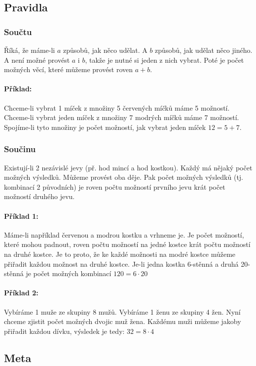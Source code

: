 \documentclass[12pt]{article}
\begin{document}
\subsection{Pravidla}
\subsubsection{Součtu}
Říká, že máme-li $a$ způsobů, jak něco udělat. A $b$ způsobů, jak udělat něco jiného. A není možné provést $a$ i $b$, takže je nutné si jeden z nich vybrat. Poté je počet možných věcí, které můžeme provést roven $a+b$.  
\paragraph{Příklad: }Chceme-li vybrat 1 míček z množiny 5 červených míčků máme 5 možností. Chceme-li vybrat jeden míček z množiny 7 modrých míčků máme 7 možností. Spojíme-li tyto množiny je počet možností, jak vybrat jeden míček $12=5+7$.
\subsubsection{Součinu}
\label{sec:pravidlo_soucinu}
Existují-li 2 nezávislé jevy (př. hod mincí a hod kostkou). Každý má nějaký počet možných výsledků. Můžeme provést oba děje. Pak počet možných výsledků (tj. kombinací 2 původních) je roven počtu možností prvního jevu krát počet možností druhého jevu.
\paragraph{Příklad 1:} Máme-li například červenou a modrou kostku a vrhneme je. Je počet možností, které mohou padnout, roven počtu možností na jedné kostce krát počtu možností na druhé kostce. Je to proto, že ke každé možnosti na modré kostce můžeme přiřadit každou možnost na druhé kostce. Je-li jedna kostka 6-stěnná a druhá 20-stěnná je počet možných kombinací $120 = 6 \cdot 20$
\paragraph{Příklad 2:} Vybíráme 1 muže ze skupiny 8 mužů. Vybíráme 1 ženu ze skupiny 4 žen. Nyní chceme zjistit počet možných dvojic muž žena. Každému muži můžeme jakoby přiřadit každou dívku, výsledek je tedy: $32 = 8 \cdot 4$

\subsection{Meta}
\end{document}
